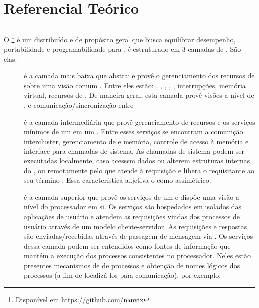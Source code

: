 \glsresetall
\chapter{Referencial Teórico}
\label{chap.background}

\section{\Lws}
\label{sec.lw}



\section{\nanvix}
O \nanvix\footnote{Disponível em https://github.com/nanvix} é um \os distribuído e de propósito geral que busca equilibrar desempenho, portabilidade e programabilidade para \lws \cite{penna:sbesc19}. \nanvix é estruturado em 3 camadas de . São elas:
\begin{description}
    \item [\nanvix \hal]
         é a camada mais baixa que abstrai e provê o gerenciamento dos recursos de \hardware sobre uma visão comum \cite{penna:hal}. Entre eles estão: \cores, \tlbs, \cache, \mmu, \noc, interrupções, memória virtual, recursos de \io. De maneira geral, esta camada provê visões a nivel de \core, \cluster e comunicação/sincronização entre \clusters \cite{penna:thesis}
    
    \item [\nanvix \Assymetric \Microkernel]
        é a camada intermediária que provê gerenciamento de recursos e os serviços mínimos de um \os em um \cluster. Entre esses serviços se encontram a comunição intercluster, gerenciamento de \threads e memória, controle de acesso à memória e interface para chamadas de sistema. As chamadas de sistema podem ser executadas localmente, caso acessem dados \rdo ou alterem estruturas internas do \core, ou remotamente pelo \mcore que atende à requisição e libera o \score requisitante ao seu término \cite{penna:thesis}. Essa característica adjetiva o \microkernel como assimétrico.
    
    \item [\nanvix \Multikernel]
        é a camada superior que provê os serviços de um \os e dispõe uma visão a nível do processador em si. Os serviços são hospedados em \clusters \ie isolados das aplicações de usuário e atendem as requisições vindas dos processos de usuário através de um modelo cliente-servidor. As requisições e respostas são enviadas/recebidas através de passagem de mensagem via \noc. Os serviços dessa camada podem ser entendidos como fontes de informação que mantém a execução dos processos consistentes no processador. Neles estão presentes mecanismos de \spawn de processos e obtenção de nomes lógicos dos processos (a fim de localizá-los para comunicação), por exemplo.
\end{description}

